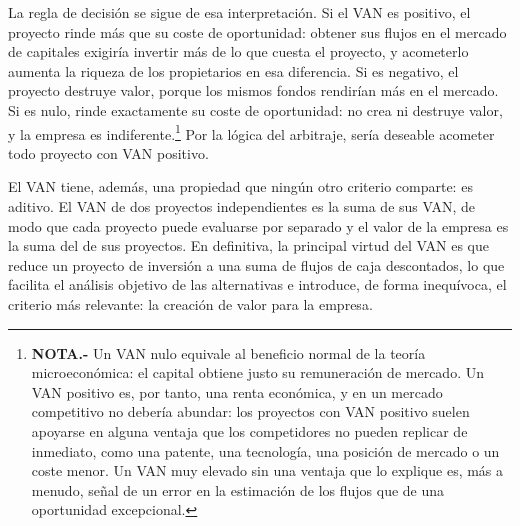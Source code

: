 \documentclass[10pt,a4paper]{article}
\begin{document}
La regla de decisión se sigue de esa interpretación. Si el VAN es positivo, el proyecto rinde más que su coste de oportunidad: obtener sus flujos en el mercado de capitales exigiría invertir más de lo que cuesta el proyecto, y acometerlo aumenta la riqueza de los propietarios en esa diferencia. Si es negativo, el proyecto destruye valor, porque los mismos fondos rendirían más en el mercado. Si es nulo, rinde exactamente su coste de oportunidad: no crea ni destruye valor, y la empresa es indiferente.\footnote{%
    \textbf{NOTA.-} Un VAN nulo equivale al beneficio normal de la teoría microeconómica: el capital obtiene justo su remuneración de mercado. Un VAN positivo es, por tanto, una renta económica, y en un mercado competitivo no debería abundar: los proyectos con VAN positivo suelen apoyarse en alguna ventaja que los competidores no pueden replicar de inmediato, como una patente, una tecnología, una posición de mercado o un coste menor. Un VAN muy elevado sin una ventaja que lo explique es, más a menudo, señal de un error en la estimación de los flujos que de una oportunidad excepcional.
} Por la lógica del arbitraje, sería deseable acometer todo proyecto con VAN positivo.

El VAN tiene, además, una propiedad que ningún otro criterio comparte: es aditivo. El VAN de dos proyectos independientes es la suma de sus VAN, de modo que cada proyecto puede evaluarse por separado y el valor de la empresa es la suma del de sus proyectos. En definitiva, la principal virtud del VAN es que reduce un proyecto de inversión a una suma de flujos de caja descontados, lo que facilita el análisis objetivo de las alternativas e introduce, de forma inequívoca, el criterio más relevante: la creación de valor para la empresa.
\end{document}
